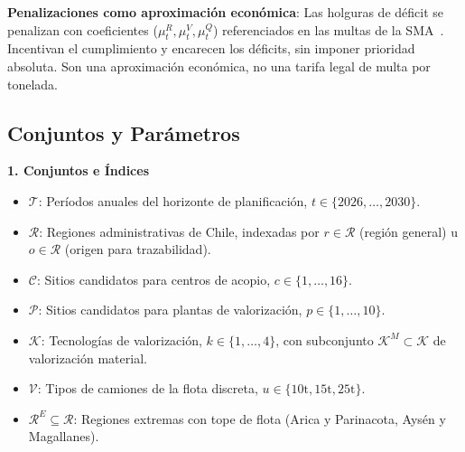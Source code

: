 \documentclass[letterpaper]{article}
\begin{document}
\textbf{Penalizaciones como aproximación económica}: Las holguras de déficit se penalizan con coeficientes ($\mu^{R}_{t}, \mu^{V}_{t}, \mu^{Q}_{t}$) referenciados en las multas de la SMA~\cite{leyrep20920}. Incentivan el cumplimiento y encarecen los déficits, sin imponer prioridad absoluta. Son una aproximación económica, no una tarifa legal de multa por tonelada.

\subsection{Conjuntos y Parámetros}

\textbf{1. Conjuntos e Índices}
\begin{itemize}\setlength{\itemsep}{1pt}\setlength{\parskip}{0pt}
    \item $\mathcal{T}$: Períodos anuales del horizonte de planificación, $t \in \{2026, \dots, 2030\}$.
    \item $\mathcal{R}$: Regiones administrativas de Chile, indexadas por $r \in \mathcal{R}$ (región general) u $o \in \mathcal{R}$ (origen para trazabilidad).
    \item $\mathcal{C}$: Sitios candidatos para centros de acopio, $c \in \{1, \dots, 16\}$.
    \item $\mathcal{P}$: Sitios candidatos para plantas de valorización, $p \in \{1, \dots, 10\}$.
    \item $\mathcal{K}$: Tecnologías de valorización, $k \in \{1, \dots, 4\}$, con subconjunto $\mathcal{K}^{M} \subset \mathcal{K}$ de valorización material.
    \item $\mathcal{V}$: Tipos de camiones de la flota discreta, $u \in \{\text{10t}, \text{15t}, \text{25t}\}$.
    \item $\mathcal{R}^{E} \subseteq \mathcal{R}$: Regiones extremas con tope de flota (Arica y Parinacota, Aysén y Magallanes).
\end{itemize}
\end{document}
